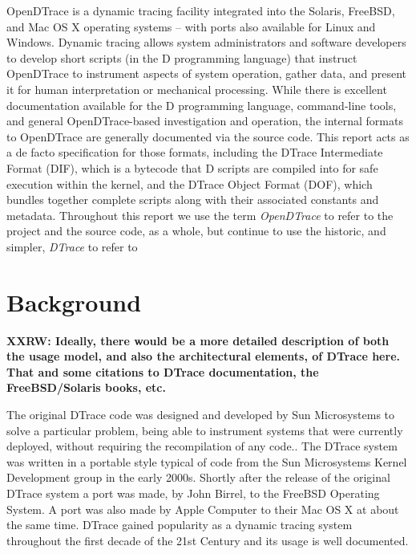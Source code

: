 OpenDTrace is a dynamic tracing facility integrated into the Solaris, FreeBSD,
and Mac OS X operating systems -- with ports also available for Linux and
Windows.
Dynamic tracing allows system administrators and software developers to
develop short scripts (in the D programming language) that instruct OpenDTrace to
instrument aspects of system operation, gather data, and present it for human
interpretation or mechanical processing.
While there is excellent documentation available for the D programming
language, command-line tools, and general OpenDTrace-based investigation and
operation, the internal formats to OpenDTrace are generally documented via the
source code.
This report acts as a de facto specification for those formats, including
the DTrace Intermediate Format (DIF), which is a bytecode that D scripts are
compiled into for safe execution within the kernel, and the DTrace Object
Format (DOF), which bundles together complete scripts along with their
associated constants and metadata.
Throughout this report we use the term \textit{OpenDTrace} to refer to
the project and the source code, as a whole, but continue to use the
historic, and simpler, \textit{DTrace} to refer to 

\section{Background}

\textbf{XXRW: Ideally, there would be a more detailed description of both the
usage model, and also the architectural elements, of DTrace here.
That and some citations to DTrace documentation, the FreeBSD/Solaris books,
etc.}

The original DTrace code was designed and developed by Sun
Microsystems to solve a particular problem, being able to instrument
systems that were currently deployed, without requiring the
recompilation of any code.\cite{DTrace2004}.  The DTrace system was
written in a portable style typical of code from the Sun Microsystems
Kernel Development group in the early 2000s.  Shortly after the
release of the original DTrace system a port was made, by John Birrel,
to the FreeBSD Operating System.  A port was also made by Apple
Computer to their Mac OS X at about the same time.  DTrace gained
popularity as a dynamic tracing system throughout the first decade of
the 21st Century and its usage is well documented.\cite{}

